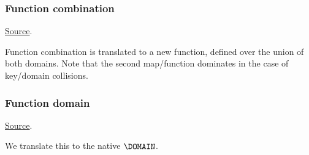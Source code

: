 \subsubsection{ Function combination}
\href{https://github.com/saltiniroberto/ssf/blob/7ea6e18093d9da3154b4e396dd435549f687e6b9/high_level/common/pythonic_code_generic.py#L117-L118}{Source}.



\begin{mathpar}
\end{mathpar}
Function combination is translated to a new function, defined over the union of both domains. Note that the second map/function dominates in the case of key/domain collisions.


\subsubsection{ Function domain}
\href{https://github.com/saltiniroberto/ssf/blob/7ea6e18093d9da3154b4e396dd435549f687e6b9/high_level/common/pythonic_code_generic.py#L121-L122}{Source}.



\begin{mathpar}
\end{mathpar}
We translate this to the \tlap{} native $\DOMAIN$.


